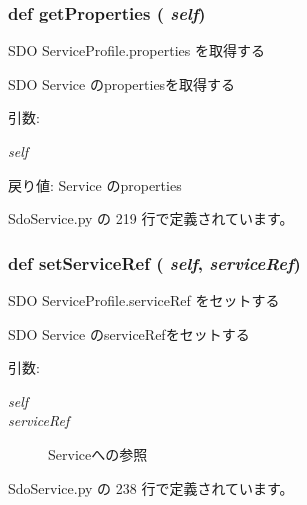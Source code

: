 \subsubsection{\setlength{\rightskip}{0pt plus 5cm}def getProperties ( {\em self})}\label{classsource__py_1_1_sdo_service_1_1_s_d_o_service_profile_19b344a150f415af073746792243ed80}


SDO ServiceProfile.properties を取得する 

SDO Service のpropertiesを取得する

\begin{Desc}
\item[引数:]
\begin{description}
\item[{\em self}]\end{description}
\end{Desc}
\begin{Desc}
\item[戻り値:]Service のproperties \end{Desc}


 SdoService.py の 219 行で定義されています。
\subsubsection{\setlength{\rightskip}{0pt plus 5cm}def setServiceRef ( {\em self},  {\em serviceRef})}\label{classsource__py_1_1_sdo_service_1_1_s_d_o_service_profile_4717ce68a485e78b6c069175011ab58e}


SDO ServiceProfile.serviceRef をセットする 

SDO Service のserviceRefをセットする

\begin{Desc}
\item[引数:]
\begin{description}
\item[{\em self}]\item[{\em serviceRef}]Serviceへの参照 \end{description}
\end{Desc}


 SdoService.py の 238 行で定義されています。

